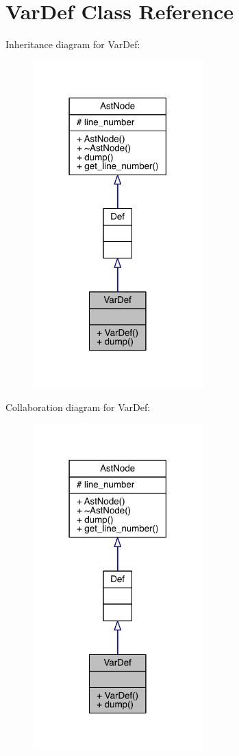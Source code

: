 \hypertarget{class_var_def}{}\section{Var\+Def Class Reference}
\label{class_var_def}


Inheritance diagram for Var\+Def\+:\nopagebreak
\begin{figure}[H]
\begin{center}
\leavevmode
\includegraphics[width=186pt]{class_var_def__inherit__graph}
\end{center}
\end{figure}


Collaboration diagram for Var\+Def\+:\nopagebreak
\begin{figure}[H]
\begin{center}
\leavevmode
\includegraphics[width=186pt]{class_var_def__coll__graph}
\end{center}
\end{figure}
